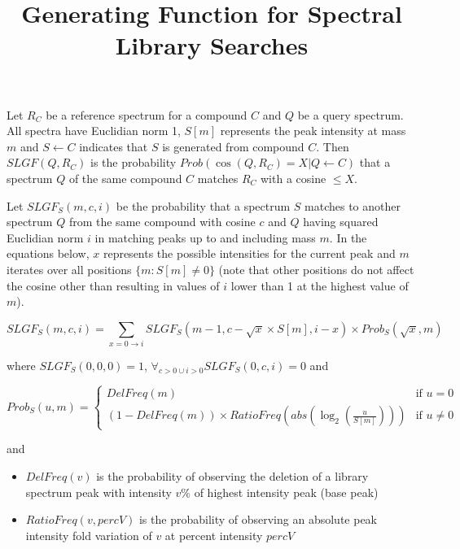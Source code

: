 \documentclass[endnotes,10pt]{article}
\begin{document}
\title{Generating Function for Spectral Library Searches}
\author{}
\date{}
\maketitle

Let $R_C$ be a reference spectrum for a compound $C$ and $Q$ be a query spectrum. All spectra have Euclidian norm 1, $S[m]$ represents the peak intensity at mass $m$ and $S\leftarrow C$ indicates that $S$ is generated from compound $C$. Then $SLGF(Q,R_C)$ is the probability $Prob(\cos(Q,R_C)= X|Q\leftarrow C)$ that a spectrum $Q$ of the same compound $C$ matches $R_C$ with a cosine $\leq X$.

Let $SLGF_S(m,c,i)$ be the probability that a spectrum $S$ matches to another spectrum $Q$ from the same compound with cosine $c$ and $Q$ having squared Euclidian norm $i$ in matching peaks up to and including mass $m$. In the equations below, $x$ represents the possible intensities for the current peak and $m$ iterates over all positions $\{m:S[m]\neq 0\}$ (note that other positions do not affect the cosine other than resulting in values of $i$ lower than 1 at the highest value of $m$).

\begin{equation}
SLGF_S(m,c,i) = \sum_{x=0\rightarrow i}
   SLGF_S( m-1, c-\sqrt{x}\times S[m], i-x ) \times Prob_S( \sqrt{x}, m )
\end{equation}

where $SLGF_S(0,0,0) = 1$, $\forall_{c>0 \cup i>0} SLGF_S(0,c,i) = 0$ and

\begin{equation}
Prob_S( u, m ) =
        \left\{ \begin{array}{ll}
            DelFreq( m ) & \mbox{if\ } u = 0\\
            (1-DelFreq(m))\times RatioFreq( abs( \log_2( \frac{ u }{ S[m] } ) ) ) & \mbox{if\ } u\neq 0
        \end{array}
        \right.
\end{equation}

and

\begin{itemize}
  \item $DelFreq(v)$ is the probability of observing the deletion of a library spectrum peak with intensity $v\%$ of highest intensity peak (base peak)
  \item $RatioFreq(v, percV)$ is the probability of observing an absolute peak intensity fold variation of $v$ at percent intensity $percV$
\end{itemize}
\end{document}
